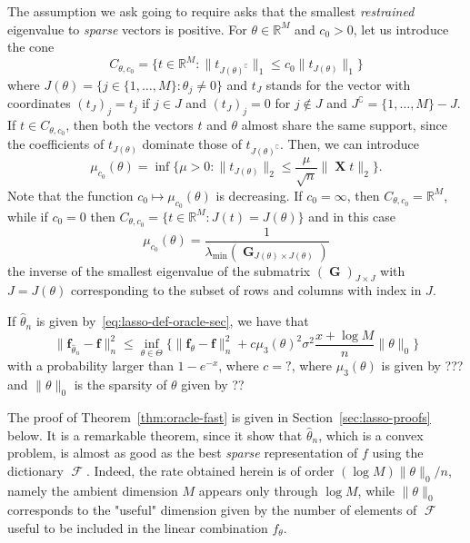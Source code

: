 \documentclass[
	fontsize=11pt, %
	twoside=false, %
	numbers=noenddot, %
]{kaobook}
\DeclareMathOperator{\cF}{{\mathcal F}}
\DeclareMathOperator{\bG}{{\boldsymbol G}}
\DeclareMathOperator{\bX}{{\boldsymbol X}}
\renewcommand{\bf}{{\boldsymbol f}}
\newcommand{\R}{\mathbb R}
\newcommand{\wh}{\widehat}
\newcommand{\norm}[1]{\| #1 \|}
\begin{document}
The assumption we ask going to require asks that the smallest \emph{restrained} eigenvalue to \emph{sparse} vectors is positive.
For $\theta \in \R^M$ and $c_0 > 0$, let us introduce the cone
\begin{equation*}
	C_{\theta, c_0} = \{ t \in \R^M : \norm{t_{J(\theta)^\complement}}_1 \leq c_0 \norm{t_{J(\theta)}}_1 \}
\end{equation*}
where $J(\theta) = \{ j \in \{1, \ldots, M\} : \theta_j \neq 0 \}$ and $t_J$ stands for the vector with coordinates $(t_J)_j = t_j$ if $j \in J$ and $(t_J)_j = 0$ for $j \notin J$ and $J^\complement = \{ 1, \ldots, M \} - J$.
If $t \in C_{\theta, c_0}$, then both the vectors $t$ and $\theta$ almost share the same support, since the coefficients of $t_{J(\theta)}$ dominate those of $t_{J(\theta)^\complement}$.
Then, we can introduce 
\begin{equation*}
	\mu_{c_0}(\theta) = \inf \Big\{ \mu > 0 : 
	\norm{t_{J(\theta)}}_2 \leq \frac{\mu}{\sqrt n} \norm{\bX t}_2 \Big\}.
\end{equation*}
Note that the function $c_0 \mapsto \mu_{c_0}(\theta)$ is decreasing.
If $c_0 = \infty$, then $C_{\theta, c_0} = \R^M$, while if $c_0 = 0$ then
$C_{\theta, c_0} = \{ t \in \R^M : J(t) = J(\theta) \}$ and in this case
\begin{equation*}
	\mu_{c_0}(\theta) = \frac{1}{\lambda_{\min}(\bG_{J(\theta) \times J(\theta)})}
\end{equation*}
the inverse of the smallest eigenvalue of the submatrix $(\bG)_{J \times J}$ with $J = J(\theta)$ corresponding to the subset of rows and columns with index in $J$.
\begin{theorem}
	\label{thm:oracle-fast}
	If $\wh \theta_n$ is given by~\eqref{eq:lasso-def-oracle-sec}, we have that
	\begin{equation*}
		\norm{\bf_{\wh \theta_n} - \bf}_n^2 \leq \inf_{\theta \in \Theta} 
		\bigg\{ \norm{\bf_{\theta} - \bf}_n^2  + c \mu_3(\theta)^2 \sigma^2 \frac{x + \log M}{n} \norm{\theta}_0 \bigg\}
	\end{equation*}
	with a probability larger than $1 - e^{-x}$, where $c = ?$, where $\mu_3(\theta)$ is given by ??? and $\norm{\theta}_0$ is the sparsity of $\theta$ given by ??
\end{theorem}
The proof of Theorem~\ref{thm:oracle-fast} is given in Section~\ref{sec:lasso-proofs} below.
It is a remarkable theorem, since it show that $\wh \theta_n$, which is a convex problem, is almost as good as the best \emph{sparse} representation of $f$ using the dictionary $\cF$.
Indeed, the rate obtained herein is of order $(\log M) \norm{\theta}_0 / n$, namely the ambient dimension $M$ appears only through $\log M$, while $\norm{\theta}_0$ corresponds to the "useful" dimension given by the number of elements of $\cF$ useful to be included in the linear combination $f_\theta$.
\end{document}
